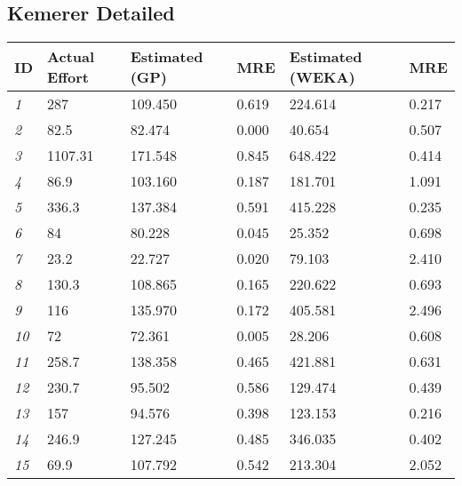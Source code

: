 \documentclass[kemerer.tex]{subfiles}
\begin{document}
	\subsection{Kemerer Detailed} %
	\label{sub:kemerer_detailed}
	\begin{tabularx}{\textwidth}{| X | X || X | X || X | X |}
	\hline
	\textbf{ID} & \textbf{Actual \newline Effort} & \textbf{Estimated (GP)} &
	\textbf{MRE} & \textbf{Estimated (WEKA)} & \textbf{MRE} \\	\hline
	\hline	
	\emph{1} & 287 & 109.450 & 0.619 & 224.614 & 0.217 \\
	\emph{2} & 82.5 & 82.474 & 0.000 & 40.654 & 0.507 \\
	\emph{3} & 1107.31 & 171.548 & 0.845 & 648.422 & 0.414 \\
	\emph{4} & 86.9 & 103.160 & 0.187 & 181.701 & 1.091 \\
	\emph{5} & 336.3 & 137.384 & 0.591 & 415.228 & 0.235 \\
	\emph{6} & 84 & 80.228 & 0.045 & 25.352 & 0.698 \\
	\emph{7} & 23.2 & 22.727 & 0.020 & 79.103 & 2.410 \\
	\emph{8} & 130.3 & 108.865 & 0.165 & 220.622 & 0.693 \\
	\emph{9} & 116 & 135.970 & 0.172 & 405.581 & 2.496 \\
	\emph{10} & 72 & 72.361 & 0.005 & 28.206 & 0.608 \\
	\emph{11} & 258.7 & 138.358 & 0.465 & 421.881 & 0.631 \\
	\emph{12} & 230.7 & 95.502 & 0.586 & 129.474 & 0.439 \\
	\emph{13} & 157 & 94.576 & 0.398 & 123.153 & 0.216 \\
	\emph{14} & 246.9 & 127.245 & 0.485 & 346.035 & 0.402 \\
	\emph{15} & 69.9 & 107.792 & 0.542 & 213.304 & 2.052 \\
	\hline
	\end{tabularx}
\end{document}
